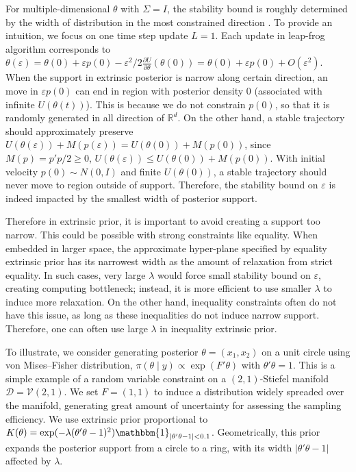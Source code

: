 \documentclass[10pt]{article}
\newcommand{\mc}[1]{\mathcal{#1}}
\DeclareMathOperator{\1}{\mathbbm{1}}
\begin{document}
For multiple-dimensional $\theta$ with $\Sigma=I$, the stability bound is roughly determined by the width of distribution in the most constrained direction  \citep{neal2011mcmc}. To provide an intuition, we focus on one  time step update $L=1$. Each update in leap-frog algorithm corresponds to $\theta(\varepsilon)=\theta(0) + \varepsilon  p(0) - \varepsilon^2/2  \frac{\partial U}{\partial  \theta } ( \theta (0)) = \theta(0) + \varepsilon  p(0) + O(\varepsilon^2)$. When the support in extrinsic posterior is narrow along certain direction, an move in $\varepsilon  p(0)$ can end in region with posterior density $0$ (associated with infinite $U(\theta(t))$). This is because we do not constrain $p(0)$, so that it is randomly generated in all direction of $\mathbb R^d$. On the other hand, a stable trajectory should approximately preserve $U(\theta(\varepsilon))+M(p(\varepsilon)) = U(\theta(0))+M(p(0))$, since $M(p)= p'p/2 \ge 0$, $U(\theta(\varepsilon))\le  U(\theta(0))+M(p(0))$. With initial velocity $p(0)\sim N(0, I)$ and finite $U(\theta(0))$, a stable trajectory should never move to region outside of support. Therefore, the stability bound on $\varepsilon$ is indeed impacted by the smallest width of posterior support.

Therefore in extrinsic prior, it is important to avoid creating a support too narrow. This could be possible with strong constraints like equality. When embedded in larger space, the approximate hyper-plane specified by equality extrinsic prior has its narrowest width as the amount of relaxation from strict equality. In such cases, very large $\lambda$ would force small stability bound on $\varepsilon$, creating computing bottleneck; instead, it is more efficient to use smaller $\lambda$ to induce more relaxation. On the other hand, inequality constraints often do not have this issue, as long as these inequalities do not induce narrow support. Therefore, one can often use large $\lambda$ in inequality extrinsic prior.

To illustrate, we consider generating posterior $\theta=(x_1,x_2)$ on a unit circle using von Mises--Fisher distribution, $\pi(\theta \mid y) \propto \exp(F'\theta)$ with $\theta'\theta =1$. This is a simple example of a random variable constraint on a $(2,1)$-Stiefel manifold $\mc D =\mc V(2,1)$. We set $F=(1,1)$ to induce a distribution widely spreaded over the manifold, generating great amount of uncertainty for assessing the sampling efficiency. We use extrinsic prior proportional to $K(\theta)= \exp(-\lambda (\theta'\theta -1)^2) \mathbbm{1}_{|\theta'\theta -1|<0.1}$. Geometrically, this prior expands the posterior support from a circle to a ring, with its width $|\theta'\theta -1|$ affected by $\lambda$.
\end{document}
